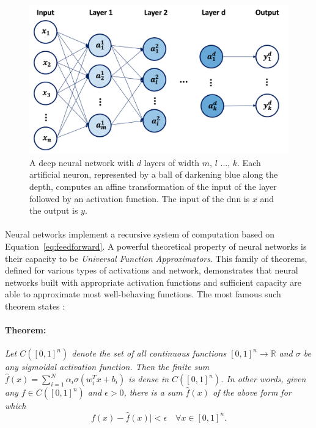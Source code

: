 \begin{figure}[h!]
    \center
    \begin{minipage}[l]{0.38\textwidth}
        \caption{A deep neural network with $d$ layers of width $m$, $l$ ..., $k$. Each artificial neuron, represented by a ball of darkening blue along the depth, computes an affine transformation of the input of the layer followed by an activation function. The input of the \gls{dnn} is $x$ and the output is $y$.} 
    \label{fig:neuralnet}
      \end{minipage}
      \begin{minipage}[c]{0.6\textwidth}
        \includegraphics[width=\textwidth]{Images/ML/neuralnet.png}
      \end{minipage}
\end{figure}

\paragraph{}Neural networks implement a recursive system of computation based on Equation~\ref{eq:feedforward}. A powerful theoretical property of neural networks is their capacity to be \textit{Universal Function Approximators}. This family of theorems, defined for various types of activations and network, demonstrates that neural networks built with appropriate activation functions and sufficient capacity are able to approximate most well-behaving functions. The most famous such theorem states \cite{universalFuncApproxNN,HORNIK1989359}:

\paragraph{Theorem:} \textit{Let $C([0, 1]^n)$ denote the set of all continuous functions $[0, 1]^n \rightarrow \mathbb{R}$ and $\sigma$ be any sigmoidal activation function. Then the finite sum $\hat{f}(x) = \sum_{i=1}^N \alpha_i \sigma(w_i^T x + b_i)$ is dense in $C([0, 1]^n)$. In other words, given any $f \in C([0, 1]^n)$ and $\epsilon > 0$, there is a sum $\hat{f}(x)$ of the above form for which \[ f(x) - \hat{f}(x)| < \epsilon \quad \forall x \in [0, 1]^n.\]}

